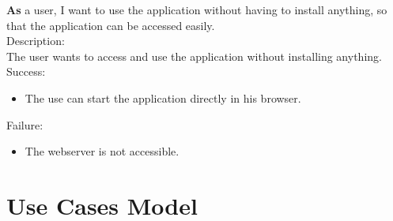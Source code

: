 \documentclass{scrreprt}
\begin{document}
\textbf{As} a user, I want to use the application without having to install anything, so that the application can be accessed easily. \\
Description:\\
The user wants to access and use the application without installing anything.
Success:\\
\begin{itemize}
  \item The use can start the application directly in his browser.
\end{itemize}
Failure:\\
\begin{itemize}
  \item The webserver is not accessible.
\end{itemize}

\section{Use Cases Model}
\end{document}
